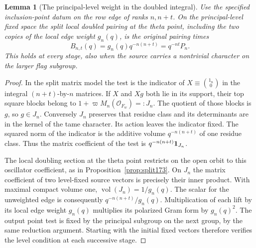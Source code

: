 \documentclass[a4paper,11pt]{article}
\newtheorem{lemma}[proposition]{Lemma}
\theoremstyle{definition}
\theoremstyle{remark}
\numberwithin{equation}{section}
\begin{document}
\begin{lemma}[The principal-level weight in the doubled integral]
\leavevmode\label{lem:pointdoubling808}
Use the specified inclusion-point datum on the row edge
of ranks \(n,n+t\). On the principal-level fixed space the
split local doubled pairing at the theta point, including
the two copies of the local edge weight \(g_n(q)\), is the
original pairing times
\[
                    B_{n,t}(q)=g_n(q)q^{-n(n+t)}
                                   =q^{-nt}P_n .
\]
This holds at every stage, also when the source carries a
nontrivial character on the larger flag subgroup.
\end{lemma}
\begin{proof}
In the split matrix model the test is the indicator of
\(X\equiv\binom{1_n}{0}\) in the integral
\((n+t)\)-by-\(n\) matrices. If \(X\) and \(Xg\) both lie in
its support, their top square blocks belong to
\(1+\varpi M_n(\mathcal O_{F_w})=:J_n\).
The quotient of those blocks is \(g\), so \(g\in J_n\).
Conversely \(J_n\) preserves that residue class and its
determinants are in the kernel of the tame character.
Its action leaves the indicator fixed. The squared norm
of the indicator is the additive volume \(q^{-n(n+t)}\)
of one residue class. Thus the matrix coefficient of the
test is \(q^{-n(n+t)}{\bf1}_{J_n}\).

The local doubling section at the theta point restricts
on the open orbit to this oscillator coefficient, as in
Proposition~\ref{prop:split173}. On \(J_n\) the matrix
coefficient of two level-fixed source vectors is precisely
their inner product. With maximal compact volume one,
\(\operatorname{vol}(J_n)=1/g_n(q)\). The scalar for the
unweighted edge is consequently \(q^{-n(n+t)}/g_n(q)\).
Multiplication of each lift by its local edge weight
\(g_n(q)\) multiplies its polarized Gram form by \(g_n(q)^2\).
The output point test is fixed by the principal subgroup
on the next group, by the same reduction argument. Starting
with the initial fixed vectors therefore verifies the level
condition at each successive stage.
\end{proof}
\end{document}
